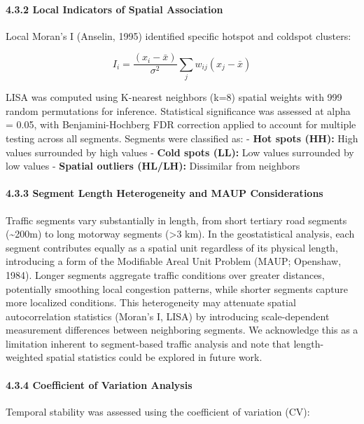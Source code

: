 \documentclass[
  12pt,
]{article}
\begin{document}
\paragraph{4.3.2 Local Indicators of Spatial Association}\label{local-indicators-of-spatial-association}

Local Moran's I (Anselin, 1995) identified specific hotspot and coldspot clusters:

\[I_i = \frac{(x_i - \bar{x})}{\sigma^2} \sum_j w_{ij}(x_j - \bar{x})\]

LISA was computed using K-nearest neighbors (k=8) spatial weights with 999 random permutations for inference. Statistical significance was assessed at alpha = 0.05, with Benjamini-Hochberg FDR correction applied to account for multiple testing across all segments. Segments were classified as: - \textbf{Hot spots (HH):} High values surrounded by high values - \textbf{Cold spots (LL):} Low values surrounded by low values - \textbf{Spatial outliers (HL/LH):} Dissimilar from neighbors

\paragraph{4.3.3 Segment Length Heterogeneity and MAUP Considerations}\label{segment-length-heterogeneity-and-maup-considerations}

Traffic segments vary substantially in length, from short tertiary road segments (\textasciitilde200m) to long motorway segments (\textgreater3 km). In the geostatistical analysis, each segment contributes equally as a spatial unit regardless of its physical length, introducing a form of the Modifiable Areal Unit Problem (MAUP; Openshaw, 1984). Longer segments aggregate traffic conditions over greater distances, potentially smoothing local congestion patterns, while shorter segments capture more localized conditions. This heterogeneity may attenuate spatial autocorrelation statistics (Moran's I, LISA) by introducing scale-dependent measurement differences between neighboring segments. We acknowledge this as a limitation inherent to segment-based traffic analysis and note that length-weighted spatial statistics could be explored in future work.

\paragraph{4.3.4 Coefficient of Variation Analysis}\label{coefficient-of-variation-analysis}

Temporal stability was assessed using the coefficient of variation (CV):
\end{document}
